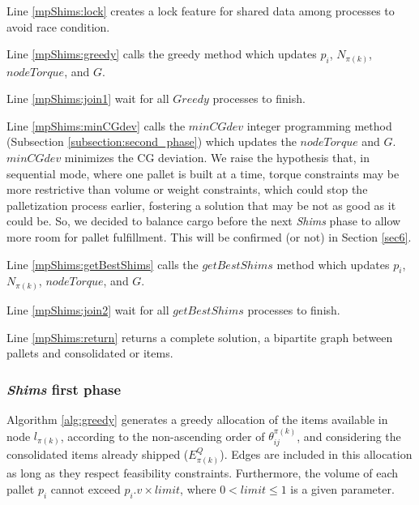 \documentclass[preprint,authoryear]{elsarticle}
\begin{document}
Line \ref{mpShims:lock} creates a lock feature for shared data among processes to avoid race condition.

Line \ref{mpShims:greedy} calls the greedy method which updates $p_i$, $N_{\pi(k)}$, $nodeTorque$, and $G$.

Line \ref{mpShims:join1} wait for all $Greedy$ processes to finish.

Line \ref{mpShims:minCGdev} calls the $minCGdev$ integer programming method (Subsection \ref{subsection:second_phase}) which updates the $nodeTorque$ and $G$. $minCGdev$ minimizes the CG deviation. We raise the hypothesis that, in sequential mode, where one pallet is built at a time, torque constraints may be more restrictive than volume or weight constraints, which could stop the palletization process earlier, fostering a solution that may be not as good as it could be. So, we decided to balance cargo before the next {\it Shims} phase to allow more room for pallet fulfillment. This will be confirmed (or not) in Section \ref{sec6}.

Line \ref{mpShims:getBestShims} calls the $getBestShims$ method which updates $p_i$, $N_{\pi(k)}$, $nodeTorque$, and $G$.

Line \ref{mpShims:join2} wait for all $getBestShims$ processes to finish.

Line \ref{mpShims:return} returns a complete solution, a bipartite graph between pallets and consolidated or items.

\subsubsection{{\it Shims} first phase}


Algorithm \ref{alg:greedy} generates a greedy allocation of the items available in node $l_{\pi(k)}$, according to the non-ascending order of $\theta^{\pi(k)}_{ij}$, and considering the consolidated items already shipped ($E^Q_{\pi(k)}$). Edges are included in this allocation as long as they respect feasibility constraints. Furthermore, the volume of each pallet $p_i$\/ cannot exceed $p_i.v \times limit$, where $ 0 < limit \leq 1$\/ is a given parameter.
\end{document}

